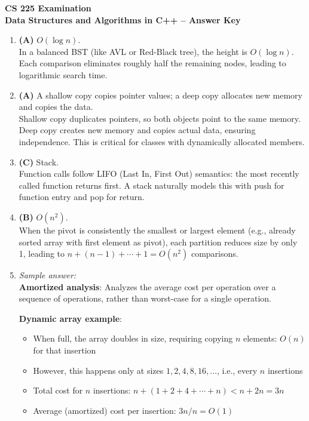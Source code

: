 \documentclass[11pt]{article}
\begin{document}
\begin{center}
  {\Large \textbf{CS 225 Examination}}\\[0.25em]
  {\large \textbf{Data Structures and Algorithms in C++ -- Answer Key}}\\[0.5em]
\end{center}

\begin{enumerate}[label=\textbf{\arabic*.}]

  \item \textbf{(A)} $O(\log n)$.\\
  In a balanced BST (like AVL or Red-Black tree), the height is $O(\log n)$. Each comparison 
  eliminates roughly half the remaining nodes, leading to logarithmic search time.

  \item \textbf{(A)} A shallow copy copies pointer values; a deep copy allocates new memory and 
  copies the data.\\
  Shallow copy duplicates pointers, so both objects point to the same memory. Deep copy creates 
  new memory and copies actual data, ensuring independence. This is critical for classes with 
  dynamically allocated members.

  \item \textbf{(C)} Stack.\\
  Function calls follow LIFO (Last In, First Out) semantics: the most recently called function 
  returns first. A stack naturally models this with push for function entry and pop for return.

  \item \textbf{(B)} $O(n^2)$.\\
  When the pivot is consistently the smallest or largest element (e.g., already sorted array with 
  first element as pivot), each partition reduces size by only 1, leading to $n + (n-1) + \cdots + 1 
  = O(n^2)$ comparisons.

  \item \emph{Sample answer:}\\
  \textbf{Amortized analysis}: Analyzes the average cost per operation over a sequence of operations, 
  rather than worst-case for a single operation.

  \textbf{Dynamic array example}:
  \begin{itemize}
    \item When full, the array doubles in size, requiring copying $n$ elements: $O(n)$ for that insertion
    \item However, this happens only at sizes $1, 2, 4, 8, 16, \ldots$, i.e., every $n$ insertions
    \item Total cost for $n$ insertions: $n + (1 + 2 + 4 + \cdots + n) < n + 2n = 3n$
    \item Average (amortized) cost per insertion: $3n/n = O(1)$
  \end{itemize}


\end{enumerate}
\end{document}
